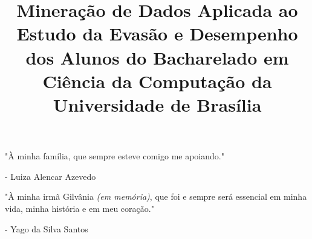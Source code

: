 \documentclass[licenciatura]{unb-cic}
\title{Mineração de Dados Aplicada ao Estudo da Evasão e Desempenho dos Alunos do Bacharelado em Ciência da Computação da Universidade de Brasília}
\begin{document}
  \maketitle
  \pretextual

  \begin{dedicatoria}
  	  	\begin{center}
  		"À minha família, que sempre esteve comigo me apoiando."
  		
  	- Luiza Alencar Azevedo
  	\end{center}
  	
  		\begin{center}
  			"À minha irmã Gilvânia \textit{(em memória)}, que foi e sempre será essencial em minha vida, minha história e em meu coração."
  			
  			- Yago da Silva Santos
  		\end{center}
  	
  \end{dedicatoria}
\end{document}
